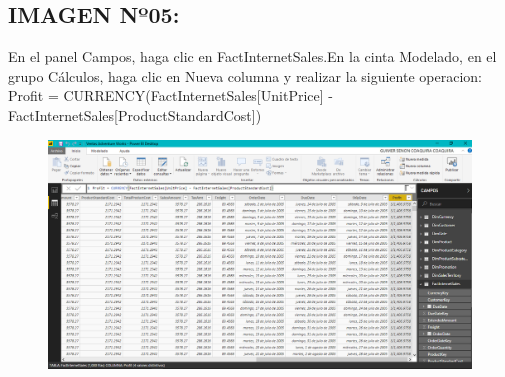 \newpage
\subsection{IMAGEN Nº05:}
\begin{itemize}
En el panel Campos, haga clic en FactInternetSales.En la cinta Modelado, en el grupo Cálculos, haga clic en Nueva columna y realizar la siguiente operacion:
Profit = CURRENCY(FactInternetSales[UnitPrice] -
FactInternetSales[ProductStandardCost])
\end{itemize}

\begin{figure}[httb]
\begin{center}
\includegraphics[width=13cm]{./Imagenes/Captura08}
\end{center}
\end{figure}